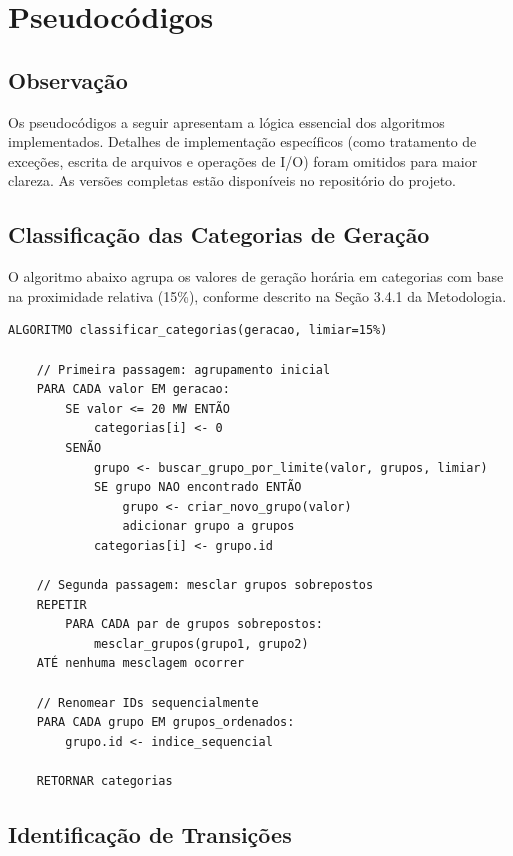 \chapter{Pseudocódigos}\label{chp:app}

\section*{Observação}

Os pseudocódigos a seguir apresentam a lógica essencial dos algoritmos implementados. Detalhes de implementação específicos (como tratamento de exceções, escrita de arquivos e operações de I/O) foram omitidos para maior clareza. As versões completas estão disponíveis no repositório do projeto.

\section{Classificação das Categorias de Geração}

O algoritmo abaixo agrupa os valores de geração horária em categorias com base na proximidade relativa (15\%), conforme descrito na Seção 3.4.1 da Metodologia.

\begin{Verbatim}[breaklines=true, frame=single]
ALGORITMO classificar_categorias(geracao, limiar=15%)
    
    // Primeira passagem: agrupamento inicial
    PARA CADA valor EM geracao:
        SE valor <= 20 MW ENTÃO
            categorias[i] <- 0
        SENÃO
            grupo <- buscar_grupo_por_limite(valor, grupos, limiar)
            SE grupo NAO encontrado ENTÃO
                grupo <- criar_novo_grupo(valor)
                adicionar grupo a grupos
            categorias[i] <- grupo.id
    
    // Segunda passagem: mesclar grupos sobrepostos
    REPETIR
        PARA CADA par de grupos sobrepostos:
            mesclar_grupos(grupo1, grupo2)
    ATÉ nenhuma mesclagem ocorrer
    
    // Renomear IDs sequencialmente
    PARA CADA grupo EM grupos_ordenados:
        grupo.id <- indice_sequencial
    
    RETORNAR categorias
\end{Verbatim}

\section{Identificação de Transições}

